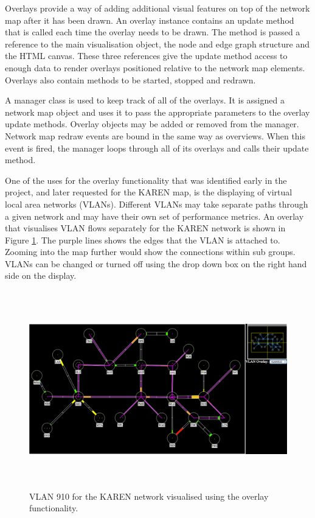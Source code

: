 \documentclass[11pt, a4paper]{article}
\begin{document}
Overlays provide a way of adding additional visual features on top of the
network map after it has been drawn. An overlay instance contains an update
method that is called each time the overlay needs to be drawn. The method is
passed a reference to the main visualisation object, the node and edge graph
structure and the HTML canvas. These three references give the update method
access to enough data to render overlays positioned relative to the network map
elements. Overlays also contain methods to be started, stopped and redrawn.

A manager class is used to keep track of all of the overlays. It is assigned a
network map object and uses it to pass the appropriate parameters to the overlay
update methods. Overlay objects may be added or removed from the manager.
Network map redraw events are bound in the same way as overviews. When this
event is fired, the manager loops through all of its overlays and calls their
update method. 

One of the uses for the overlay functionality that was identified early in the
project, and later requested for the KAREN map, is the displaying of virtual
local area networks (VLANs). Different VLANs may take separate paths through a
given network and may have their own set of performance metrics. An overlay that
visualises VLAN flows separately for the KAREN network is shown in Figure
\ref{fig:overlays1.0}. The purple lines shows the edges that the VLAN is
attached to. Zooming into the map further would show the connections within sub
groups. VLANs can be changed or turned off using the drop down box on the right
hand side on the display.

\begin{figure} 
\centering
\includegraphics[width=170mm,height=85.71mm]{assets/overlays1-0.pdf}
\caption{VLAN 910 for the KAREN network visualised using the overlay
functionality.}
\label{fig:overlays1.0} 
\end{figure}
\end{document}
